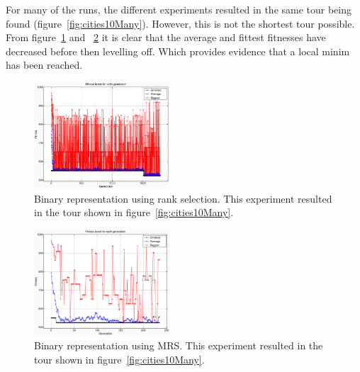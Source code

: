 \documentclass[10pt,a4paper,openbib]{article}
\begin{document}
\begin{multicols}{2}
\noindent For many of the runs, the different experiments resulted in the same tour being found (figure~\ref{fig:cities10Many}). However, this is not the shortest tour possible. From figure~\ref{fig:cities10GraphBinaryfalse} and ~\ref{fig:cities10GraphBinarytrue} it is clear that the average and fittest fitnesses have decreased before then levelling off. Which provides evidence that a local minim has been reached.

\begin{figure}[H]
\begin{center}
        \includegraphics[width=0.45\textwidth]{images/result1/GraphBinaryfalse2.png}
        \caption{Binary representation using rank selection. This experiment resulted in the tour shown in figure~\ref{fig:cities10Many}.}
        \label{fig:cities10GraphBinaryfalse}
\end{center}
\end{figure}

\begin{figure}[H]
\begin{center}
        \includegraphics[width=0.45\textwidth]{images/result1/GraphBinarytrue1.png}
        \caption{Binary representation using MRS. This experiment resulted in the tour shown in figure~\ref{fig:cities10Many}.}
        \label{fig:cities10GraphBinarytrue}
\end{center}
\end{figure} 



\end{multicols}
\end{document}
